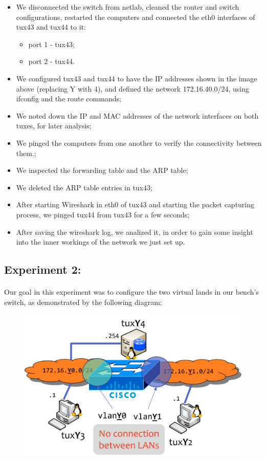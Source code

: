 \documentclass[11pt]{article}
\begin{document}
\begin{itemize}
    \item We disconnected the switch from netlab, cleaned the router and switch configurations, restarted the computers and connected the eth0 interfaces of tux43 and tux44 to it:
    \begin{itemize}
        \item port 1 - tux43;
        \item port 2 - tux44.
    \end{itemize}
    \item We configured tux43 and tux44 to have the IP addresses shown in the image above (replacing Y with 4), and defined the network 172.16.40.0/24, using ifconfig and the route commands;
    \item We noted down the IP and MAC addresses of the network interfaces on both tuxes, for later analysis;
    \item We pinged the computers from one another to verify the connectivity between them.;
    \item We inspected the forwarding table and the ARP table;
    \item We deleted the ARP table entries in tux43;
    \item After starting Wireshark in eth0 of tux43 and starting the packet capturing process, we pinged tux44 from tux43 for a few seconds;
    \item After saving the wireshark log, we analized it, in order to gain some insight into the inner workings of the network we just set up.
\end{itemize}

\subsection*{Experiment 2:}

\paragraph{}Our goal in this experiment was to configure the two virtual lands in our bench's switch, as demonstrated by the following diagram:

\begin{figure}[h]
\includegraphics[scale=1]{images/net-exp2.png}
\centering
\end{figure}
\end{document}
